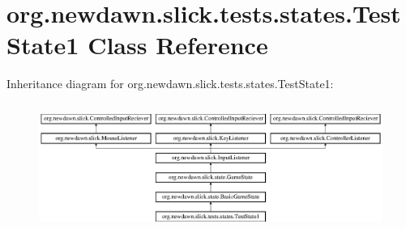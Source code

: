 \hypertarget{classorg_1_1newdawn_1_1slick_1_1tests_1_1states_1_1_test_state1}{}\section{org.\+newdawn.\+slick.\+tests.\+states.\+Test\+State1 Class Reference}
\label{classorg_1_1newdawn_1_1slick_1_1tests_1_1states_1_1_test_state1}
Inheritance diagram for org.\+newdawn.\+slick.\+tests.\+states.\+Test\+State1\+:\begin{figure}[H]
\begin{center}
\leavevmode
\includegraphics[height=4.226415cm]{classorg_1_1newdawn_1_1slick_1_1tests_1_1states_1_1_test_state1}
\end{center}
\end{figure}
